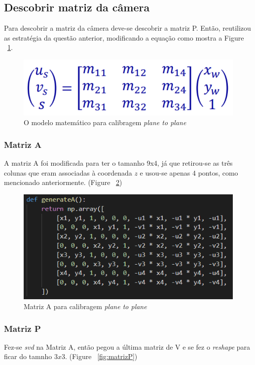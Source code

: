 \documentclass{article}
\begin{document}
    \subsection{Descobrir matriz da câmera}
    Para descobrir a matriz da câmera deve-se descobrir a matriz P. Então, reutilizou as estratégia da questão anterior, modificando a equação como mostra a Figure ~\ref{fig:planeToPlane}.
    \begin{figure}[h!]
    \centering
    \includegraphics[scale=0.6]{planeToPlane.PNG}
    \caption{O modelo matemático para calibragem \textit{plane to plane}}
    \label{fig:planeToPlane}
    \end{figure}

        \subsubsection{Matriz A}
        A matriz A foi modificada para ter o tamanho 9x4, já que retirou-se as três colunas que eram associadas à coordenada \(z\) e usou-se apenas 4 pontos, como mencionado anteriormente. (Figure ~\ref{fig:matrizA})

        \begin{figure}[h!]
        \centering
        \includegraphics[scale=1]{matrizA.PNG}
        \caption{Matriz A para calibragem \textit{plane to plane}}
        \label{fig:matrizA}
        \end{figure}

        \subsubsection{Matriz P}
        Fez-se \textit{svd} na Matriz A, então pegou a última matriz de V e se fez o \textit{reshape} para ficar do tamnho \(3x3\). (Figure ~\ref{fig:matrizP})
\end{document}
